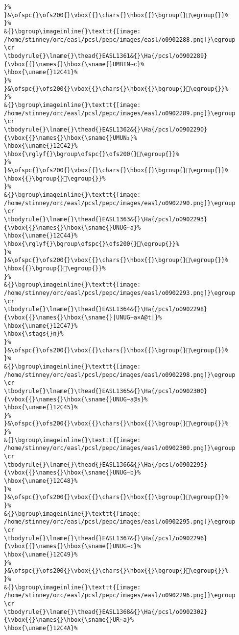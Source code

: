 \begin{verbatim}
}%
}&\ofspc{}\ofs200{}\vbox{{}\chars{}\hbox{{}\bgroup{}𒱀\egroup{}}%
}%
&{}\bgroup\imageinline{}\texttt{[image: /home/stinney/orc/easl/pcsl/pepc/images/easl/o0902288.png]}\egroup
\cr
\tbodyrule{}\lname{}\thead{}EASL1361&{}\Ha{/pcsl/o0902289}{\vbox{{}\names{}\hbox{\sname{}UMBIN∼c}%
\hbox{\uname{}12C41}%
}%
}&\ofspc{}\ofs200{}\vbox{{}\chars{}\hbox{{}\bgroup{}𒱁\egroup{}}%
}%
&{}\bgroup\imageinline{}\texttt{[image: /home/stinney/orc/easl/pcsl/pepc/images/easl/o0902289.png]}\egroup
\cr
\tbodyrule{}\lname{}\thead{}EASL1362&{}\Ha{/pcsl/o0902290}{\vbox{{}\names{}\hbox{\sname{}UMUN₂}%
\hbox{\uname{}12C42}%
\hbox{\rglyf{}\bgroup\ofspc{}\ofs200{}𒱂\egroup{}}%
}%
}&\ofspc{}\ofs200{}\vbox{{}\chars{}\hbox{{}\bgroup{}𒱃\egroup{}}%
\hbox{{}\bgroup{}𒱂\egroup{}}%
}%
&{}\bgroup\imageinline{}\texttt{[image: /home/stinney/orc/easl/pcsl/pepc/images/easl/o0902290.png]}\egroup
\cr
\tbodyrule{}\lname{}\thead{}EASL1363&{}\Ha{/pcsl/o0902293}{\vbox{{}\names{}\hbox{\sname{}UNUG∼a}%
\hbox{\uname{}12C44}%
\hbox{\rglyf{}\bgroup\ofspc{}\ofs200{}𒱄\egroup{}}%
}%
}&\ofspc{}\ofs200{}\vbox{{}\chars{}\hbox{{}\bgroup{}𒱆\egroup{}}%
\hbox{{}\bgroup{}𒱄\egroup{}}%
}%
&{}\bgroup\imageinline{}\texttt{[image: /home/stinney/orc/easl/pcsl/pepc/images/easl/o0902293.png]}\egroup
\cr
\tbodyrule{}\lname{}\thead{}EASL1364&{}\Ha{/pcsl/o0902298}{\vbox{{}\names{}\hbox{\sname{}|UNUG∼a×A@t|}%
\hbox{\uname{}12C47}%
\hbox{\stags{}n}%
}%
}&\ofspc{}\ofs200{}\vbox{{}\chars{}\hbox{{}\bgroup{}𒱇\egroup{}}%
}%
&{}\bgroup\imageinline{}\texttt{[image: /home/stinney/orc/easl/pcsl/pepc/images/easl/o0902298.png]}\egroup
\cr
\tbodyrule{}\lname{}\thead{}EASL1365&{}\Ha{/pcsl/o0902300}{\vbox{{}\names{}\hbox{\sname{}UNUG∼a@s}%
\hbox{\uname{}12C45}%
}%
}&\ofspc{}\ofs200{}\vbox{{}\chars{}\hbox{{}\bgroup{}𒱅\egroup{}}%
}%
&{}\bgroup\imageinline{}\texttt{[image: /home/stinney/orc/easl/pcsl/pepc/images/easl/o0902300.png]}\egroup
\cr
\tbodyrule{}\lname{}\thead{}EASL1366&{}\Ha{/pcsl/o0902295}{\vbox{{}\names{}\hbox{\sname{}UNUG∼b}%
\hbox{\uname{}12C48}%
}%
}&\ofspc{}\ofs200{}\vbox{{}\chars{}\hbox{{}\bgroup{}𒱈\egroup{}}%
}%
&{}\bgroup\imageinline{}\texttt{[image: /home/stinney/orc/easl/pcsl/pepc/images/easl/o0902295.png]}\egroup
\cr
\tbodyrule{}\lname{}\thead{}EASL1367&{}\Ha{/pcsl/o0902296}{\vbox{{}\names{}\hbox{\sname{}UNUG∼c}%
\hbox{\uname{}12C49}%
}%
}&\ofspc{}\ofs200{}\vbox{{}\chars{}\hbox{{}\bgroup{}𒱉\egroup{}}%
}%
&{}\bgroup\imageinline{}\texttt{[image: /home/stinney/orc/easl/pcsl/pepc/images/easl/o0902296.png]}\egroup
\cr
\tbodyrule{}\lname{}\thead{}EASL1368&{}\Ha{/pcsl/o0902302}{\vbox{{}\names{}\hbox{\sname{}UR∼a}%
\hbox{\uname{}12C4A}%

\end{verbatim}
